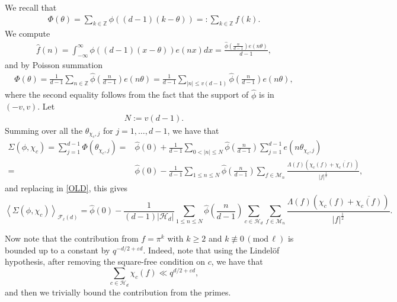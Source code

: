 \documentclass[12pt]{amsart}
\newcommand{\Z}{\mathbb{Z}}
\renewcommand{\pmod}[1]{\,(\mathrm{mod}\,#1)}
\begin{document}
We recall that 
\begin{align*}
\Phi(\theta)=\sum_{k\in \Z}\phi((d-1)(k-\theta)) =: \sum_{k\in \Z} f(k)             . \end{align*}
We compute
\begin{align*}
\widehat{f}(n)
=\int_{-\infty}^\infty \phi((d-1)(x-\theta))e(nx)dx
= \frac{\widehat{\phi}\left(\frac{n}{d-1}\right) e\left(n\theta\right)}{d-1}, 
\end{align*}
and by Poisson summation
\begin{align*}
\Phi(\theta)=\frac{1}{d-1} \sum_{n\in \Z} \widehat{\phi}\left(\frac{n}{d-1}\right) e\left(n\theta\right) = \frac{1}{d-1} \sum_{|n| \leq v (d-1) }\widehat{\phi}\left(\frac{n}{d-1}\right) e\left(n\theta\right),
             \end{align*}
             where the second equality follows from the fact that the support of $\widehat{\phi}$ is  in $(-v, v)$.
             Let
             \begin{align*} %
             N := v (d-1). \end{align*}
Summing over all the $\theta_{\chi_c,j}$ for $j=1,\ldots,d-1$,  we have that
 \begin{align*}
\Sigma(\phi, \chi_c) = \sum_{j=1}^{d-1} \Phi(\theta_{\chi_c,j}) =& \widehat{\phi}(0)+ \frac{1}{d-1} \sum_{0<|n|\leq N} \widehat{\phi}\left(\frac{n}{d-1}\right) \sum_{j=1}^{d-1} e(n\theta_{\chi_c,j})\\
=&  \widehat{\phi}(0)- \frac{1}{d-1}\sum_{1 \leq n \leq N} \widehat{\phi}\left(\frac{n}{d-1}\right) \sum_{f\in \mathcal{M}_{n}} \frac{\Lambda(f) (\chi_c(f)+\overline{\chi_c(f)})}{|f|^\frac{1}{2}}, 
\end{align*}
and replacing in \eqref{OLD}, this gives
$$ \left\langle\Sigma(\phi,\chi_c)\right\rangle_{\mathcal{F}_\ell(d)} =  \widehat{\phi}(0) - \frac{1}{(d-1)|\mathcal{H}_d|}\sum_{1 \leq n\leq N} \widehat{\phi}\left(\frac{n}{d-1}\right) \sum_{c \in \mathcal{H}_d} \sum_{f\in \mathcal{M}_{n}} \frac{\Lambda(f) (\chi_c(f)+\overline{\chi_c(f)})}{|f|^\frac{1}{2}}.$$

Now note that the contribution from $f = \pi^k$ with $k \geq 2$  and $k \not \equiv 0 \pmod{\ell}$ is bounded up to a constant by $q^{-d/2+\varepsilon d}$. Indeed, note that using the Lindel\"of hypothesis, after removing the square-free condition on $c$, we have that
$$\sum_{c \in \mathcal{H}_d} \chi_c(f) \ll q^{d/2+\varepsilon d},$$
and then we trivially bound the contribution from the primes.
\end{document}
